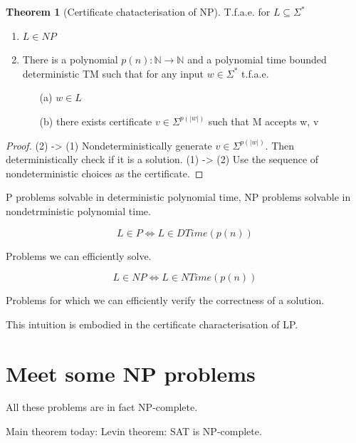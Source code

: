 \documentclass[a4paper,12pt]{article}
\theoremstyle{definition}
\newtheorem{theorem}[counter]{Theorem}
\theoremstyle{remark}
\newcommand{\N}{\mathbb{N}}
\begin{document}
\begin{theorem}[Certificate chatacterisation of NP]
    T.f.a.e. for $L \subseteq \Sigma^*$
    \begin{enumerate}
        \item $L \in NP$
        \item There is a polynomial $p(n): \N \to \N$ and a polynomial time bounded deterministic TM such that for any input $w \in \Sigma^*$ t.f.a.e.
        \begin{itemize}
            \item[(a)] $w \in L$
            \item[(b)] there exists certificate $v \in \Sigma^{p(|w|)}$ such that M accepts w, v
        \end{itemize}
    \end{enumerate}

\end{theorem}

\begin{proof}
    (2) -> (1) Nondeterministically generate $v \in \Sigma^{p(|w|)}$. Then deterministically check if it is a solution.
    (1) -> (2) Use the sequence of nondeterministic choices as the certificate.
\end{proof}






\newpage
P problems solvable in deterministic polynomial time, NP problems solvable in nondetrministic polynomial time.

\begin{equation*}
    L \in P \iff L \in DTime(p(n))
\end{equation*}

Problems we can efficiently solve.

\begin{equation*}
    L \in NP \iff L \in NTime(p(n))
\end{equation*}


Problems for which we can efficiently verify the correctness of a solution.

This intuition is embodied in the certificate characterisation of LP.

\section{Meet some NP problems}
All these problems are in fact NP-complete.

Main theorem today: Levin theorem: SAT is NP-complete.
\end{document}

